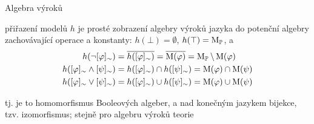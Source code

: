 \documentclass{beamer}
\begin{document}
\begin{frame}{Algebra výroků}


    přiřazení modelů $h$ je prosté zobrazení algebry výroků jazyka do \alert{potenční algebry}  \alert{zachovávající} operace a konstanty: $h(\bot)=\emptyset$, $h(\top)=\operatorname{M}_\mathbb P$, a
    {\small
    \begin{align*}
        h(\neg[\varphi]_\sim)&=\overline{h([\varphi]_\sim)}=\overline{\operatorname{M}(\varphi)}=\operatorname{M}_\mathbb P\setminus\operatorname{M}(\varphi)\\
        h([\varphi]_\sim\land[\psi]_\sim)&=h([\varphi]_\sim)\cap h([\psi]_\sim)=\operatorname{M}(\varphi)\cap\operatorname{M}(\psi)\\
        h([\varphi]_\sim\lor[\psi]_\sim)&=h([\varphi]_\sim)\cup h([\psi]_\sim)=\operatorname{M}(\varphi)\cup\operatorname{M}(\psi)
    \end{align*}
    }

    \vspace{-6pt}

    tj. je to  \alert{homomorfismus} Booleových algeber, a nad konečným jazykem bijekce, tzv. \alert{izomorfismus}; stejně pro algebru výroků teorie


\end{frame}
\end{document}
